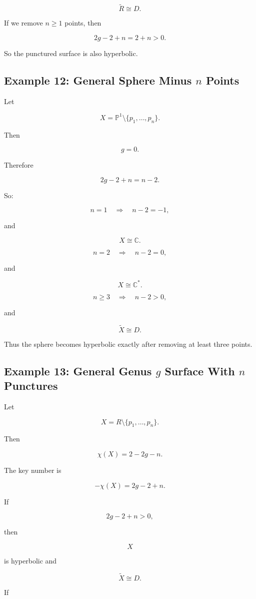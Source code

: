 \documentclass[12pt,a4paper]{article}
\theoremstyle{notespace}
\begin{document}
\[
\widetilde R
\cong
D.
\]

If we remove \(n\ge1\) points, then

\[
2g-2+n
=
2+n>0.
\]

So the punctured surface is also hyperbolic.

\subsection{Example 12: General Sphere Minus \(n\) Points}

Let

\[
X=\mathbb P^1\setminus\{p_1,\dots,p_n\}.
\]

Then

\[
g=0.
\]

Therefore

\[
2g-2+n
=
n-2.
\]

So:

\[
n=1
\quad\Rightarrow\quad
n-2=-1,
\]

and

\[
X\cong\mathbb C.
\]

\[
n=2
\quad\Rightarrow\quad
n-2=0,
\]

and

\[
X\cong\mathbb C^*.
\]

\[
n\ge3
\quad\Rightarrow\quad
n-2>0,
\]

and

\[
\widetilde X\cong D.
\]

Thus the sphere becomes hyperbolic exactly after removing at least three points.

\subsection{Example 13: General Genus \(g\) Surface With \(n\) Punctures}

Let

\[
X=R\setminus\{p_1,\dots,p_n\}.
\]

Then

\[
\chi(X)=2-2g-n.
\]

The key number is

\[
-\chi(X)=2g-2+n.
\]

If

\[
2g-2+n>0,
\]

then

\[
X
\]

is hyperbolic and

\[
\widetilde X\cong D.
\]

If
\end{document}
